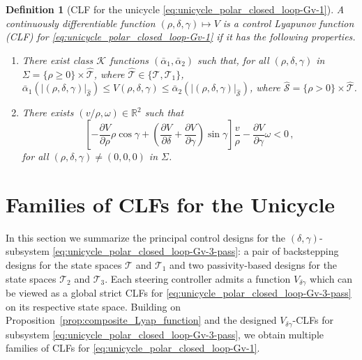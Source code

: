 \documentclass[letterpaper, 10 pt, conference]{ieeeconf}  %
\newtheorem{definition}{Definition}
\begin{document}
\begin{definition}[CLF for the unicycle \eqref{eq:unicycle_polar_closed_loop-Gv-1}]
\label{def-CLF}
A continuously differentiable function $(\rho,\delta,\gamma)\mapsto V$ 
is a \textit{control Lyapunov function} (CLF) for \eqref{eq:unicycle_polar_closed_loop-Gv-1} if it has the following properties.
\begin{enumerate}
\item There exist class $\mathcal{K}$ functions  $(\bar\alpha_1,\bar\alpha_2)$ such that,  for all $(\rho,\delta,\gamma)$ in 
$\Sigma = \{\rho\geq 0\}\times \hat{\mathcal{T}}$, where $\hat{\mathcal{T}}\in\{\mathcal{T},\mathcal{T}_1\}$, 
$ \bar\alpha_1(|(\rho,\delta, \gamma)|_{\hat{\mathcal{S}}}) \le V(\rho,\delta,\gamma) \le \bar\alpha_2(|(\rho,\delta, \gamma)|_{\hat{\mathcal{S}}})$, where $\hat{\mathcal{S}} = \{\rho> 0\}\times \hat{\mathcal{T}}$. \label{it:clf_prop_1}
\item There exists $(v/\rho,\omega)\in \mathbb{R}^2$ such that
\begin{equation*}
\left[-\dfrac{\partial V}{\partial\rho}\rho\cos\gamma + \left(\dfrac{\partial V}{\partial\delta}+\dfrac{\partial V}{\partial\gamma}\right)\sin\gamma \right]\dfrac{v}{\rho} - \dfrac{\partial V}{\partial\gamma}\omega < 0 \,,
\end{equation*}
for all $(\rho,\delta,\gamma)\neq (0,0,0)$ in $\Sigma$. \label{it:clf_prop_2}
\end{enumerate}
\end{definition}



\section{Families of CLFs for the Unicycle}

In this section we summarize the principal control designs for the $(\delta,\gamma)$-subsystem \eqref{eq:unicycle_polar_closed_loop-Gv-3-pass}: a pair of backstepping designs for the state spaces $\mathcal{T}$ and $\mathcal{T}_1$ and two passivity-based designs for the state spaces $\mathcal{T}_2$ and $\mathcal{T}_3$. Each steering controller admits a function $V_{\delta\gamma}$ which can be viewed as a global strict CLFs for \eqref{eq:unicycle_polar_closed_loop-Gv-3-pass} on its respective state space. Building on Proposition~\ref{prop:composite_Lyap_function} and the designed $V_{\delta\gamma}$-CLFs for subsystem \eqref{eq:unicycle_polar_closed_loop-Gv-3-pass}, we obtain multiple families of CLFs for \eqref{eq:unicycle_polar_closed_loop-Gv-1}.
\end{document}
